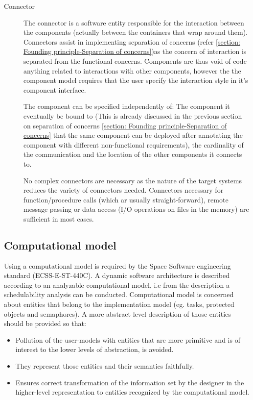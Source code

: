 \begin{description}
\item [Connector] The connector is a software entity responsible for the interaction between the components (actually between the containers that wrap around them). Connectors assist in implementing separation of concerns (refer \cref{section: Founding principle-Separation of concerns})as the concern of interaction is separated from the functional concerns. Components are thus void of code anything related to interactions with other components, however the the component model requires that the user specify the interaction style in it's component interface.

The component can be specified independently of: The component it eventually be bound to (This is already discussed in the previous section on separation of concerns \cref{section: Founding principle-Separation of concerns} that the same component can be deployed after annotating the component with different non-functional requirements), the cardinality of the communication and the location of the other components it connects to. 

No complex connectors are necessary as the nature of the target systems reduces the variety of connectors needed. Connectors necessary for function/procedure calls (which ar usually straight-forward), remote message passing or data access (I/O operations on files in the memory) are sufficient in most cases.          
\end{description} 

\subsection{Computational model}
\label{section: Computational model} 
Using a computational model is required by the Space Software engineering standard (ECSS-E-ST-440C). A dynamic software architecture is described according to an analyzable computational model, i.e from the description a schedulability analysis can be conducted. Computational model is concerned about entities that belong to the implementation model (eg. tasks, protected objects and semaphores). A more abstract level description of those entities should be provided so that:

\begin{itemize}
\item Pollution of the user-models with entities that are more primitive and is of interest to the lower levels of abstraction, is avoided.

\item They represent those entities and their semantics faithfully.

\item Ensures correct transformation of the information set by the designer in the higher-level representation to entities recognized by the computational model.
\end{itemize} 

